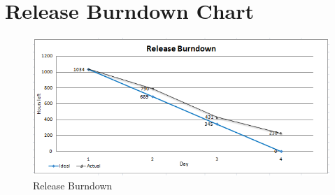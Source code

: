\section{Release Burndown Chart}
\label{chap:Release Burndown Chart}
\begin{figure}[h]
\begin{center}
\includegraphics[scale=0.7]{img/SCRUM/releaseBurndown.PNG}
\caption{Release Burndown}
\label{fig:Release Burndown}
\end{center}
\end{figure}





